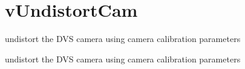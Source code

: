 \hypertarget{group__vUndistortCam}{\section{v\-Undistort\-Cam}
\label{group__vUndistortCam}
}


undistort the D\-V\-S camera using camera calibration parameters  


undistort the D\-V\-S camera using camera calibration parameters 